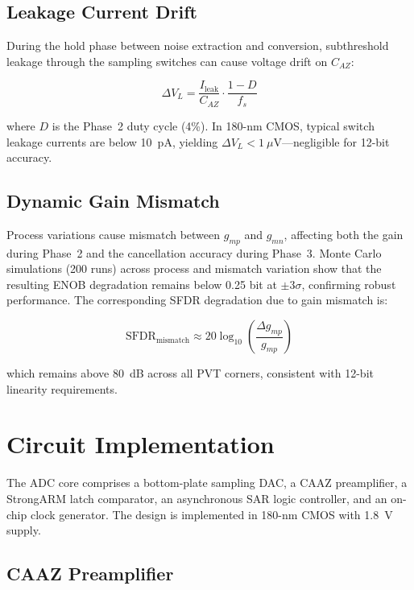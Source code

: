 \documentclass[journal]{IEEEtran}
\begin{document}
\subsection{Leakage Current Drift}

During the hold phase between noise extraction and conversion, subthreshold leakage through the sampling switches can cause voltage drift on $C_{AZ}$:

\begin{equation}
\Delta V_L = \frac{I_{\text{leak}}}{C_{AZ}} \cdot \frac{1-D}{f_s}
\label{eq:leakage}
\end{equation}

where $D$ is the Phase~2 duty cycle (4\%). In 180-nm CMOS, typical switch leakage currents are below 10~pA, yielding $\Delta V_L < 1~\mu$V---negligible for 12-bit accuracy.

\subsection{Dynamic Gain Mismatch}

Process variations cause mismatch between $g_{mp}$ and $g_{mn}$, affecting both the gain during Phase~2 and the cancellation accuracy during Phase~3. Monte Carlo simulations (200 runs) across process and mismatch variation show that the resulting ENOB degradation remains below 0.25 bit at $\pm 3\sigma$, confirming robust performance. The corresponding SFDR degradation due to gain mismatch is:

\begin{equation}
\text{SFDR}_{\text{mismatch}} \approx 20\log_{10}\left(\frac{\Delta g_{mp}}{g_{mp}}\right)
\label{eq:sfdr_mismatch}
\end{equation}

which remains above 80~dB across all PVT corners, consistent with 12-bit linearity requirements.

\section{Circuit Implementation}
\label{sec:implementation}

The ADC core comprises a bottom-plate sampling DAC, a CAAZ preamplifier, a StrongARM latch comparator, an asynchronous SAR logic controller, and an on-chip clock generator. The design is implemented in 180-nm CMOS with 1.8~V supply.

\subsection{CAAZ Preamplifier}
\end{document}
